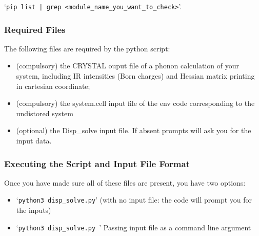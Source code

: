 `\texttt{pip list | grep <module\_name\_you\_want\_to\_check>}'.

\subsubsection{Required Files}
The following files are required by the python script:
\begin{itemize}  
  \item (compulsory) the CRYSTAL ouput file of a phonon calculation of your system, including IR
    intensities (Born charges) and Hessian matrix printing in cartesian coordinate;
  \item (compulsory) the system.cell input file of the env code corresponding
    to the undistored system
  \item (optional) the Disp\_solve input file. If absent prompts will ask you
    for the input data.  
\end{itemize}





\subsubsection{Executing the Script and Input File Format}
Once you have made sure all of these files are present, you have two options: 
\begin{itemize}
	\item `\texttt{python3 disp_solve.py}' (with no input file: the code
          will prompt you for the inputs)
	\item `\texttt{python3 disp_solve.py }' Passing input file as a command line argument
\end{itemize}


